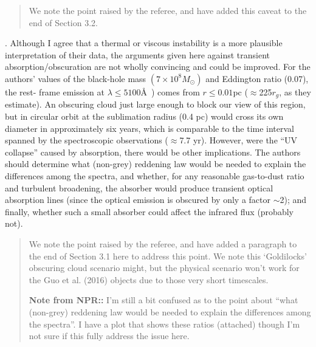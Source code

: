 \documentclass[11pt, a4paper]{article}
\begin{document}
\begin{quote}
We note the point raised by the referee, and have added this caveat to 
the end of Section 3.2. 

\end{quote}


. Although I agree that a thermal or viscous instability is a more
plausible interpretation of their data, the arguments given here
against transient absorption/obscuration are not wholly convincing and
could be improved. For the authors’ values of the black-hole mass
$(7\times10^{8} M_{\odot})$ and Eddington ratio (0.07), the rest-
frame emission at $\lambda \leq 5100$\AA\ ) comes from $r \leq 0.01$pc
($\approx$225$r_{g}$, as they estimate). An obscuring cloud just large
enough to block our view of this region, but in circular orbit at the
sublimation radius (0.4 pc) would cross its own diameter in
approximately six years, which is comparable to the time interval
spanned by the spectroscopic observations ($\approx$7.7 yr). However,
were the ``UV collapse'' caused by absorption, there would be other
implications. The authors should determine what (non-grey) reddening
law would be needed to explain the differences among the spectra, and
whether, for any reasonable gas-to-dust ratio and turbulent
broadening, the absorber would produce transient optical absorption
lines (since the optical emission is obscured by only a factor
$\sim$2); and finally, whether such a small absorber could affect the
infrared flux (probably not).

\begin{quote}
We note the point raised by the referee, and have added a paragraph to
the end of Section 3.1 here to address this point. We note this
`Goldilocks' obscuring cloud scenario might, but the physical scenario
won't work for the Guo et al. (2016) objects due to those very short
timescales.

{\bf Note from NPR::} I'm still a bit confused as to the point about 
``what  (non-grey) reddening law would be needed to explain the 
differences among the spectra''. I have a plot that shows these ratios 
(attached) though I'm not sure if this fully address the issue here. 

\end{quote}
\end{document}
